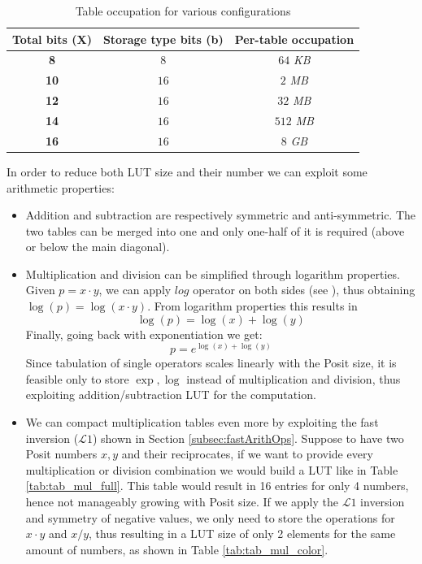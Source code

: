 \begin{table}[H]
\centering
\caption{Table occupation for various configurations}
\label{tab:table_occup}
\begin{tabular}{ccc}
\hline \textbf{Total bits (X)}
           & \textbf{Storage type bits (b)}   
           & \textbf{Per-table occupation}
\\ \hline
 \textbf{8} & $8$ & $64$ \textit{KB}\\ \hline
 \textbf{10} & $16$ & $2$ \textit{MB} \\ \hline
 \textbf{12}& $16$ & $32$ \textit{MB} \\ \hline
 \textbf{14}& $16$ & $512$ \textit{MB}\\ \hline
  \textbf{16} & $16$ & $8$ \textit{GB}\\ \hline
\end{tabular}
\end{table}


In order to reduce both LUT size and their number we can exploit some arithmetic properties:
\begin{itemize}
    \item Addition and subtraction are respectively symmetric and anti-symmetric. The two tables can be merged into one and only one-half of it is required (above or below the main diagonal).
    \item Multiplication and division can be simplified through logarithm properties. Given $p=x\cdot y$, we can apply $log$ operator on both sides (see \cite{arnold2003interval}), thus obtaining $\log(p) = \log(x\cdot y)$. From logarithm properties this results in \[\log(p) = \log(x)+\log(y)\] Finally, going back with exponentiation we get: \[ p = e^{\log(x)+\log(y)} \] Since tabulation of single operators scales linearly with the Posit size, it is feasible only to store $\exp,\log$ instead of multiplication and division, thus exploiting addition/subtraction LUT for the computation. 
    \item We can compact multiplication tables even more by exploiting the fast inversion ($\mathcal{L}1$) shown in Section \ref{subsec:fastArithOps}. Suppose to have two Posit numbers $x,y$ and their reciprocates, if we want to provide every multiplication or division combination we would build a LUT like in Table \ref{tab:tab_mul_full}. This table would result in 16 entries for only 4 numbers, hence not manageably growing with Posit size. If we apply the $\mathcal{L}1$ inversion and symmetry of negative values, we only need to store the operations for $x\cdot y$ and $x/y$, thus resulting in a LUT size of only 2 elements for the same amount of numbers, as shown in Table \ref{tab:tab_mul_color}.
\end{itemize}

